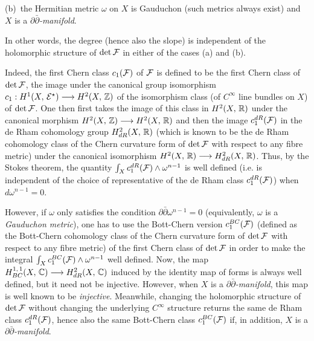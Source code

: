 \documentclass[12pt]{article}
\begin{document}
(b)\, the Hermitian metric $\omega$ on $X$ is Gauduchon (such metrics always exist) and $X$ is a {\it $\partial\bar\partial$-manifold}.

\vspace{1ex}  


\noindent In other words, the degree (hence also the slope) is independent of the holomorphic structure of $\det{\cal F}$ in either of the cases (a) and (b).

Indeed, the first Chern class $c_1({\cal F})$ of ${\cal F}$ is defined to be the first Chern class of $\det{\cal F}$, the image under the canonical group isomorphism $c_1:H^1(X,\,{\cal E}^\star)\longrightarrow H^2(X,\,\mathbb{Z})$ of the isomorphism class (of $C^\infty$ line bundles on $X$) of $\det{\cal F}$. One then first takes the image of this class in $H^2(X,\,\mathbb{R})$ under the canonical morphism $H^2(X,\,\mathbb{Z})\longrightarrow H^2(X,\,\mathbb{R})$ and then the image $c_1^{dR}({\cal F})$ in the de Rham cohomology group $H^2_{dR}(X,\,\mathbb{R})$ (which is known to be the de Rham cohomology class of the Chern curvature form of $\det{\cal F}$ with respect to any fibre metric) under the canonical isomorphism $H^2(X,\,\mathbb{R})\longrightarrow H^2_{dR}(X,\,\mathbb{R})$. Thus, by the Stokes theorem, the quantity $\int_Xc_1^{dR}({\cal F})\wedge\omega^{n-1}$ is well defined (i.e. is independent of the choice of representative of the de Rham class $c_1^{dR}({\cal F})$) when $d\omega^{n-1} = 0$.

However, if $\omega$ only satisfies the condition $\partial\bar\partial\omega^{n-1} = 0$ (equivalently, $\omega$ is a {\it Gauduchon metric}), one has to use the Bott-Chern version $c_1^{BC}({\cal F})$ (defined as the Bott-Chern cohomology class of the Chern curvature form of $\det{\cal F}$ with respect to any fibre metric) of the first Chern class of $\det{\cal F}$ in order to make the integral $\int_Xc_1^{BC}({\cal F})\wedge\omega^{n-1}$ well defined. Now, the map $H^{1,\,1}_{BC}(X,\,\mathbb{C})\longrightarrow H^2_{dR}(X,\,\mathbb{C})$ induced by the identity map of forms is always well defined, but it need not be injective. However, when $X$ is a {\it $\partial\bar\partial$-manifold}, this map is well known to be {\it injective}. Meanwhile, changing the holomorphic structure of $\det{\cal F}$ without changing the underlying $C^\infty$ structure returns the same de Rham class $c_1^{dR}({\cal F})$, hence also the same Bott-Chern class $c_1^{BC}({\cal F})$ if, in addition, $X$ is a {\it $\partial\bar\partial$-manifold}.

\vspace{1ex}
\end{document}
